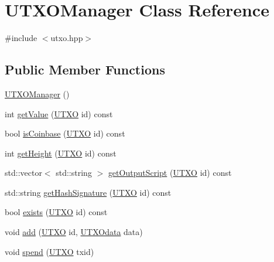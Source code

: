 \hypertarget{classUTXOManager}{}\section{U\+T\+X\+O\+Manager Class Reference}
\label{classUTXOManager}


{\ttfamily \#include $<$utxo.\+hpp$>$}

\subsection*{Public Member Functions}
\begin{DoxyCompactItemize}
\item 
\mbox{\hyperlink{classUTXOManager_aa08c4e17616d0a2436df1c8307b5da26}{U\+T\+X\+O\+Manager}} ()
\item 
int \mbox{\hyperlink{classUTXOManager_ae326f42b81d5d21b5232b715e7cef076}{get\+Value}} (\mbox{\hyperlink{utxo_8hpp_a19091d002da03ec92277e19295ac4540}{U\+T\+XO}} id) const
\item 
bool \mbox{\hyperlink{classUTXOManager_a4bcd0b36baf1ed245c48a826db241345}{is\+Coinbase}} (\mbox{\hyperlink{utxo_8hpp_a19091d002da03ec92277e19295ac4540}{U\+T\+XO}} id) const
\item 
int \mbox{\hyperlink{classUTXOManager_a4ae666af31dc1be4bd160a179aeef2ce}{get\+Height}} (\mbox{\hyperlink{utxo_8hpp_a19091d002da03ec92277e19295ac4540}{U\+T\+XO}} id) const
\item 
std\+::vector$<$ std\+::string $>$ \mbox{\hyperlink{classUTXOManager_a156c895274840fa2c6c93fead39b38e5}{get\+Output\+Script}} (\mbox{\hyperlink{utxo_8hpp_a19091d002da03ec92277e19295ac4540}{U\+T\+XO}} id) const
\item 
std\+::string \mbox{\hyperlink{classUTXOManager_acfad0e67f3b475bd4d6a9fd0fb977e6a}{get\+Hash\+Signature}} (\mbox{\hyperlink{utxo_8hpp_a19091d002da03ec92277e19295ac4540}{U\+T\+XO}} id) const
\item 
bool \mbox{\hyperlink{classUTXOManager_a599c57b261e313bd99a3783e1ad7def5}{exists}} (\mbox{\hyperlink{utxo_8hpp_a19091d002da03ec92277e19295ac4540}{U\+T\+XO}} id) const
\item 
void \mbox{\hyperlink{classUTXOManager_ab0ed356ad058c35e0bd4f97a8eb34380}{add}} (\mbox{\hyperlink{utxo_8hpp_a19091d002da03ec92277e19295ac4540}{U\+T\+XO}} id, \mbox{\hyperlink{structUTXOdata}{U\+T\+X\+Odata}} data)
\item 
void \mbox{\hyperlink{classUTXOManager_af08863b6400556a6350b3d7122cd1dc4}{spend}} (\mbox{\hyperlink{utxo_8hpp_a19091d002da03ec92277e19295ac4540}{U\+T\+XO}} txid)
\end{DoxyCompactItemize}
